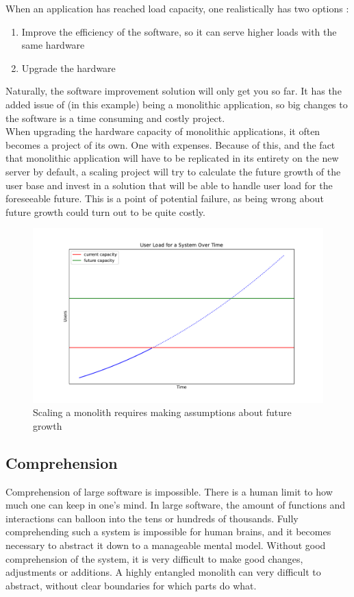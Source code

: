 When an application has reached load capacity, one realistically has two options \cite*{Scalability}:
\begin{enumerate}
    \item Improve the efficiency of the software, so it can serve higher loads with the same hardware
    \item Upgrade the hardware
\end{enumerate}
Naturally, the software improvement solution will only get you so far. It has the added issue of (in this example) being a monolithic application, so big changes to the software is a time consuming and costly project.\\
When upgrading the hardware capacity of monolithic applications, it often becomes a project of its own. One with expenses.
Because of this, and the fact that monolithic application will have to be replicated in its entirety on the new server by default, a scaling project will try to calculate the future growth of the user base and invest in a solution that will be able to handle user load for the foreseeable future.
This is a point of potential failure, as being wrong about future growth could turn out to be quite costly.
\begin{figure}[ht]
    \centering
    \includegraphics[width=0.8\columnwidth]{Figures/Graphs/capacity_scaling.pdf}
    \caption{Scaling a monolith requires making assumptions about future growth}
    \label{Monolith scaling}
\end{figure}

\subsection{Comprehension}
Comprehension of large software is impossible.
There is a human limit to how much one can keep in one's mind.
In large software, the amount of functions and interactions can balloon into the tens or hundreds of thousands.
Fully comprehending such a system is impossible for human brains, and it becomes necessary to abstract it down to a manageable mental model.
Without good comprehension of the system, it is very difficult to make good changes, adjustments or additions.
A highly entangled monolith can very difficult to abstract, without clear boundaries for which parts do what.


